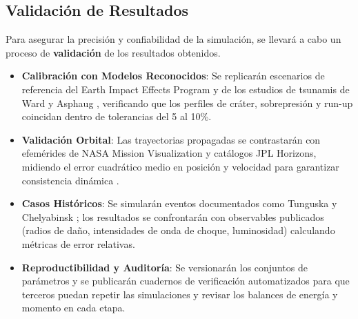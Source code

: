 \documentclass[conference]{IEEEtran}
\begin{document}
\subsection{Validación de Resultados}
Para asegurar la precisión y confiabilidad de la simulación, se llevará a cabo
un proceso de \textbf{validación} de los resultados obtenidos.
\begin{itemize}
	\item \textbf{Calibración con Modelos Reconocidos}: Se replicarán escenarios de referencia del Earth Impact
	      Effects Program \cite{collins2005} y de los estudios de tsunamis de
	      Ward y Asphaug \cite{ward2000,wuennemann2010}, verificando que los perfiles
	      de cráter, sobrepresión y run-up coincidan dentro de tolerancias del 5
	      al 10\%.
	\item \textbf{Validación Orbital}: Las trayectorias propagadas se contrastarán con efemérides de
	      NASA Mission Visualization y catálogos JPL Horizons, midiendo el error
	      cuadrático medio en posición y velocidad para garantizar consistencia
	      dinámica \cite{nasaEllipticalOrbit}.
	\item \textbf{Casos Históricos}: Se simularán eventos documentados como Tunguska
	      \cite{chyba1993} y Chelyabinsk \cite{popova2013}; los resultados se
	      confrontarán con observables publicados (radios de daño, intensidades de
	      onda de choque, luminosidad) calculando métricas de error relativas.
	\item \textbf{Reproductibilidad y Auditoría}: Se versionarán los conjuntos de
	      parámetros y se publicarán cuadernos de verificación automatizados para
	      que terceros puedan repetir las simulaciones y revisar los balances de
	      energía y momento en cada etapa.
\end{itemize}
\end{document}
